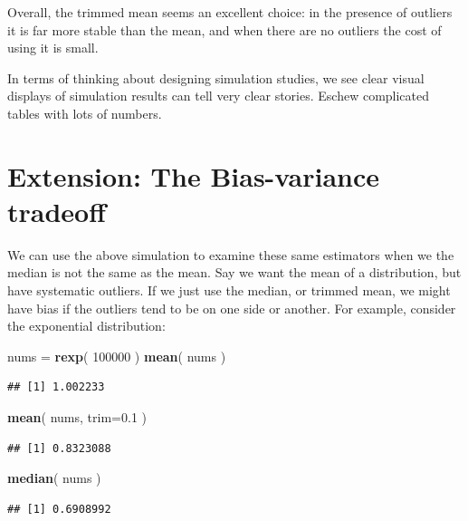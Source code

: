 \documentclass[
]{book}
\newenvironment{Shaded}{\begin{snugshade}}{\end{snugshade}}
\newcommand{\AttributeTok}[1]{\textcolor[rgb]{0.13,0.29,0.53}{#1}}
\newcommand{\DecValTok}[1]{\textcolor[rgb]{0.00,0.00,0.81}{#1}}
\newcommand{\FloatTok}[1]{\textcolor[rgb]{0.00,0.00,0.81}{#1}}
\newcommand{\FunctionTok}[1]{\textcolor[rgb]{0.13,0.29,0.53}{\textbf{#1}}}
\newcommand{\NormalTok}[1]{#1}
\newcommand{\OtherTok}[1]{\textcolor[rgb]{0.56,0.35,0.01}{#1}}
\begin{document}
Overall, the trimmed mean seems an excellent choice: in the presence of
outliers it is far more stable than the mean, and when there are no outliers
the cost of using it is small.

In terms of thinking about designing simulation studies, we see clear
visual displays of simulation results can tell very clear stories. Eschew
complicated tables with lots of numbers.

\section{Extension: The Bias-variance tradeoff}\label{extension-the-bias-variance-tradeoff}

We can use the above simulation to examine these same estimators when we the
median is not the same as the mean. Say we want the mean of a distribution,
but have systematic outliers. If we just use the median, or trimmed mean, we
might have bias if the outliers tend to be on one side or another. For
example, consider the exponential distribution:

\begin{Shaded}
\begin{Highlighting}[]
\NormalTok{nums }\OtherTok{=} \FunctionTok{rexp}\NormalTok{( }\DecValTok{100000}\NormalTok{ )}
\FunctionTok{mean}\NormalTok{( nums )}
\end{Highlighting}
\end{Shaded}

\begin{verbatim}
## [1] 1.002233
\end{verbatim}

\begin{Shaded}
\begin{Highlighting}[]
\FunctionTok{mean}\NormalTok{( nums, }\AttributeTok{trim=}\FloatTok{0.1}\NormalTok{ )}
\end{Highlighting}
\end{Shaded}

\begin{verbatim}
## [1] 0.8323088
\end{verbatim}

\begin{Shaded}
\begin{Highlighting}[]
\FunctionTok{median}\NormalTok{( nums )}
\end{Highlighting}
\end{Shaded}

\begin{verbatim}
## [1] 0.6908992
\end{verbatim}
\end{document}
